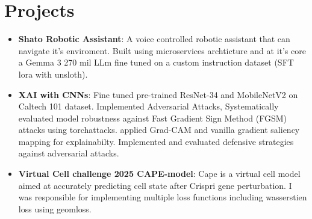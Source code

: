 \documentclass[letterpaper,11pt]{article}
\newcommand{\resumeItem}[2]{
  \item\small{
    \textbf{#1}{: #2 \vspace{-2pt}}
  }
}
\newcommand{\resumeSubItem}[2]{\resumeItem{#1}{#2}\vspace{-4pt}}
\newcommand{\resumeSubHeadingListStart}{\begin{itemize}[leftmargin=*]}
\newcommand{\resumeSubHeadingListEnd}{\end{itemize}}
\begin{document}
\section{Projects}
  \resumeSubHeadingListStart
    \resumeSubItem{Shato Robotic Assistant}
      {A voice controlled robotic assistant that can navigate it's enviroment. Built using microservices archticture and at it's core a Gemma 3 270 mil LLm fine tuned on a custom instruction dataset (SFT lora with unsloth). }
    \resumeSubItem{XAI with CNNs}
      {Fine tuned pre-trained ResNet-34 and MobileNetV2 on Caltech 101 dataset. Implemented Adversarial Attacks, Systematically evaluated model robustness against Fast Gradient Sign Method (FGSM) attacks using torchattacks. applied Grad-CAM and vanilla gradient saliency mapping for explainabilty. Implemented and evaluated defensive strategies against adversarial attacks.}
    \resumeSubItem{Virtual Cell challenge 2025 CAPE-model}
      {Cape is a virtual cell model aimed at accurately predicting cell state after Crispri gene perturbation. I was responsible for implementing multiple loss functions including wasserstien loss using geomloss.}

  \resumeSubHeadingListEnd
\end{document}
